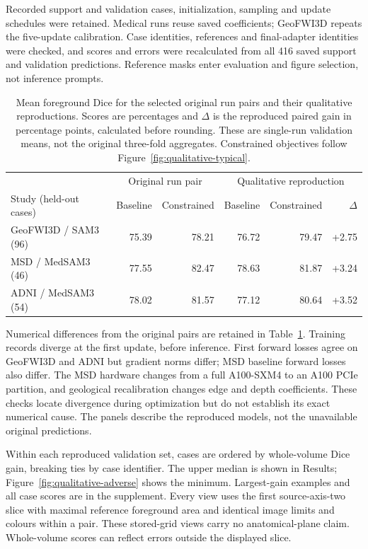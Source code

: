 \documentclass[12pt,a4paper]{article}
\begin{document}
Recorded support and validation cases, initialization, sampling and
update schedules were retained. Medical runs reuse saved coefficients;
GeoFWI3D repeats the five-update calibration. Case identities, references
and final-adapter identities were checked, and scores and errors were
recalculated from all 416 saved support and validation predictions.
Reference masks enter evaluation and figure selection, not inference
prompts.

\begin{table}[htbp]
\centering\small{}
\renewcommand{\arraystretch}{1.2}
\begin{tabular}{@{}lrrrrr@{}}
\hline
& \multicolumn{2}{c}{Original run pair} &
\multicolumn{3}{c}{Qualitative reproduction} \\
Study (held-out cases) & Baseline & Constrained & Baseline & Constrained & $\Delta$ \\
\hline
GeoFWI3D / SAM3 (96) & 75.39 & 78.21 & 76.72 & 79.47 & +2.75 \\
MSD / MedSAM3 (46) & 77.55 & 82.47 & 78.63 & 81.87 & +3.24 \\
ADNI / MedSAM3 (54) & 78.02 & 81.57 & 77.12 & 80.64 & +3.52 \\
\hline
\end{tabular}
\caption{Mean foreground Dice for the selected original run pairs and
their qualitative reproductions. Scores are percentages and $\Delta$ is
the reproduced paired gain in percentage points, calculated before
rounding. These are single-run validation means, not the original
three-fold aggregates. Constrained objectives follow
Figure~\ref{fig:qualitative-typical}.}
\label{tab:qualitative-reproduction-scores}
\end{table}

Numerical differences from the original pairs are retained in
Table~\ref{tab:qualitative-reproduction-scores}. Training records diverge
at the first update, before inference. First forward losses agree on
GeoFWI3D and ADNI but gradient norms differ; MSD baseline forward losses
also differ. The MSD hardware changes from a full A100-SXM4 to an A100
PCIe partition, and geological recalibration changes edge and depth
coefficients. These checks locate divergence during optimization but
do not establish its exact numerical cause. The panels describe the
reproduced models, not the unavailable original predictions.

Within each reproduced validation set, cases are ordered by whole-volume
Dice gain, breaking ties by case identifier. The upper median is shown
in Results; Figure~\ref{fig:qualitative-adverse} shows the minimum.
Largest-gain examples and all case scores are in the supplement. Every
view uses the first source-axis-two slice with maximal reference
foreground area and identical image limits and colours within a pair.
These stored-grid views carry no anatomical-plane claim. Whole-volume
scores can reflect errors outside the displayed slice.
\end{document}
